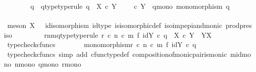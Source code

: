 \begin{isabellebody}
\ \ \ \ \ \ \isamarkupfalse%
\ q\ \ q{\isacharunderscore}{\kern0pt}type{\isacharbrackleft}{\kern0pt}type{\isacharunderscore}{\kern0pt}rule{\isacharbrackright}{\kern0pt}{\isacharcolon}{\kern0pt}\ {\isachardoublequoteopen}q\ {\isacharcolon}{\kern0pt}\ X\ {\isasymtimes}\isactrlsub c\ Y\ \ {\isasymrightarrow}\ \ {\isasymOmega}\ {\isasymtimes}\isactrlsub c\ Y{\isachardoublequoteclose}\ \ q{\isacharunderscore}{\kern0pt}mono{\isacharcolon}{\kern0pt}\ {\isachardoublequoteopen}monomorphism\ q{\isachardoublequoteclose}\isanewline
\ \ \ \ \ \ \ \ \isamarkupfalse%
\ {\isacharparenleft}{\kern0pt}meson\ {\isacartoucheopen}X\ {\isasymcong}\ {\isasymOmega}{\isacartoucheclose}\ id{\isacharunderscore}{\kern0pt}isomorphism\ id{\isacharunderscore}{\kern0pt}type\ is{\isacharunderscore}{\kern0pt}isomorphic{\isacharunderscore}{\kern0pt}def\ iso{\isacharunderscore}{\kern0pt}imp{\isacharunderscore}{\kern0pt}epi{\isacharunderscore}{\kern0pt}and{\isacharunderscore}{\kern0pt}monic\ prod{\isacharunderscore}{\kern0pt}pres{\isacharunderscore}{\kern0pt}iso{\isacharparenright}{\kern0pt}\ \isanewline
\ \ \ \ \ \ \isamarkupfalse%
\ rnmq{\isacharunderscore}{\kern0pt}type{\isacharbrackleft}{\kern0pt}type{\isacharunderscore}{\kern0pt}rule{\isacharbrackright}{\kern0pt}{\isacharcolon}{\kern0pt}\ {\isachardoublequoteopen}r\ {\isasymcirc}\isactrlsub c\ n\ {\isasymcirc}\isactrlsub c\ {\isacharparenleft}{\kern0pt}m\ {\isasymtimes}\isactrlsub f\ id{\isacharparenleft}{\kern0pt}Y{\isacharparenright}{\kern0pt}{\isacharparenright}{\kern0pt}\ {\isasymcirc}\isactrlsub c\ q\ {\isacharcolon}{\kern0pt}\ X\ {\isasymtimes}\isactrlsub c\ Y\ {\isasymrightarrow}\ Y\isactrlbsup X\isactrlesup {\isachardoublequoteclose}\isanewline
\ \ \ \ \ \ \ \ \isamarkupfalse%
\ typecheck{\isacharunderscore}{\kern0pt}cfuncs\isanewline
\ \ \ \ \ \ \isamarkupfalse%
\ {\isachardoublequoteopen}monomorphism{\isacharparenleft}{\kern0pt}r\ {\isasymcirc}\isactrlsub c\ n\ {\isasymcirc}\isactrlsub c\ {\isacharparenleft}{\kern0pt}m\ {\isasymtimes}\isactrlsub f\ id{\isacharparenleft}{\kern0pt}Y{\isacharparenright}{\kern0pt}{\isacharparenright}{\kern0pt}\ {\isasymcirc}\isactrlsub c\ q{\isacharparenright}{\kern0pt}{\isachardoublequoteclose}\isanewline
\ \ \ \ \ \ \ \ \isamarkupfalse%
\ {\isacharparenleft}{\kern0pt}typecheck{\isacharunderscore}{\kern0pt}cfuncs{\isacharcomma}{\kern0pt}\ simp\ add{\isacharcolon}{\kern0pt}\ cfunc{\isacharunderscore}{\kern0pt}type{\isacharunderscore}{\kern0pt}def\ composition{\isacharunderscore}{\kern0pt}of{\isacharunderscore}{\kern0pt}monic{\isacharunderscore}{\kern0pt}pair{\isacharunderscore}{\kern0pt}is{\isacharunderscore}{\kern0pt}monic\ m{\isacharunderscore}{\kern0pt}id{\isacharunderscore}{\kern0pt}mono\ n{\isacharunderscore}{\kern0pt}mono\ q{\isacharunderscore}{\kern0pt}mono\ r{\isacharunderscore}{\kern0pt}mono{\isacharparenright}{\kern0pt}\isanewline

\end{isabellebody}
